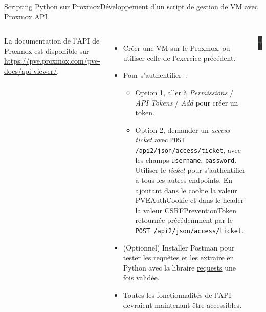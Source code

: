 \documentclass{beamer}
\begin{document}
    \begin{frame}{Scripting Python sur Proxmox}{Développement d’un script de gestion de VM avec Proxmox API}
        \footnotesize
        \begin{columns}
            La documentation de l'API de Proxmox est disponible sur \url{https://pve.proxmox.com/pve-docs/api-viewer/}.
            \begin{itemize}
                \item Créer une VM sur le Proxmox, ou utiliser celle de l'exercice précédent.
                \item Pour s'authentifier~:
                \begin{itemize}
                    \footnotesize
                    \item Option 1, aller à \textit{Permissions} / \textit{API Tokens} / \textit{Add} pour créer un token.
                    \item Option 2, demander un \textit{access ticket} avec \lstinline{POST /api2/json/access/ticket}, avec les champs \lstinline{username}, \lstinline{password}.
                    Utiliser le \textit{ticket} pour s'authentifier à tous les autres endpoints.
                    En ajoutant dans le cookie la valeur PVEAuthCookie et dans le header la valeur CSRFPreventionToken retournée précédemment par le \lstinline{POST /api2/json/access/ticket}.
                \end{itemize}
                \item (Optionnel) Installer Postman pour tester les requêtes et les extraire en Python avec la libraire \href{https://fr.python-requests.org/en/latest/}{requests} une fois validée.
                \item Toutes les fonctionnalités de l'API devraient maintenant être accessibles.
            \end{itemize}
            \centering
            \includegraphics[width=2cm]{image/pve-api-viewer}
        \end{columns}
    \end{frame}
\end{document}
